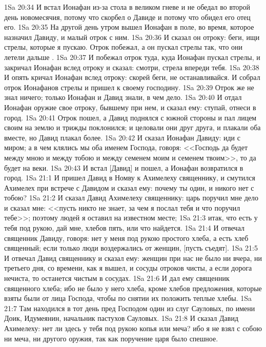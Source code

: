 \vs 1Sa 20:34 И встал Ионафан из-за стола в великом гневе и не обедал во второй день новомесячия, потому что скорбел о Давиде и потому что обидел его отец его.
\vs 1Sa 20:35 На другой день утром вышел Ионафан в поле, во время, которое назначил Давиду, и малый отрок с ним.
\vs 1Sa 20:36 И сказал он отроку: беги, ищи стрелы, которые я пускаю. Отрок побежал, а он пускал стрелы так, что они летели дальше .
\vs 1Sa 20:37 И побежал отрок туда, куда Ионафан пускал стрелы, и закричал Ионафан вслед отроку и сказал: смотри, стрела впереди тебя.
\vs 1Sa 20:38 И опять кричал Ионафан вслед отроку: скорей беги, не останавливайся. И собрал отрок Ионафанов стрелы и пришел к своему господину.
\vs 1Sa 20:39 Отрок же не знал ничего; только Ионафан и Давид знали, в чем дело.
\vs 1Sa 20:40 И отдал Ионафан оружие свое отроку, бывшему при нем, и сказал ему: ступай, отнеси в город.
\vs 1Sa 20:41 Отрок пошел, а Давид поднялся с южной стороны и пал лицем своим на землю и трижды поклонился; и целовали они друг друга, и плакали оба вместе, но Давид плакал более.
\vs 1Sa 20:42 И сказал Ионафан Давиду: иди с миром; а в чем клялись мы оба именем Господа, говоря: <<Господь да будет между мною и между тобою и между семенем моим и семенем твоим>>, то да будет на веки.
\vs 1Sa 20:43 И встал [Давид] и пошел, а Ионафан возвратился в город.
\vs 1Sa 21:1 И пришел Давид в Номву к Ахимелеху священнику, и смутился Ахимелех при встрече с Давидом и сказал ему: почему ты один, и никого нет с тобою?
\vs 1Sa 21:2 И сказал Давид Ахимелеху священнику: царь поручил мне дело и сказал мне: <<пусть никто не знает, за чем я послал тебя и что поручил тебе>>; поэтому людей я оставил на известном месте;
\vs 1Sa 21:3 итак, что есть у тебя под рукою, дай мне, хлебов пять, или что найдется.
\vs 1Sa 21:4 И отвечал священник Давиду, говоря: нет у меня под рукою простого хлеба, а есть хлеб священный; если только люди  воздержались от женщин, [пусть съедят].
\vs 1Sa 21:5 И отвечал Давид священнику и сказал ему: женщин при нас не было ни вчера, ни третьего дня, со времени, как я вышел, и сосуды отроков чисты, а если дорога нечиста, то  останется чистым в сосудах.
\vs 1Sa 21:6 И дал ему священник священного хлеба; ибо не было у него хлеба, кроме хлебов предложения, которые взяты были от лица Господа, чтобы по снятии их положить теплые хлебы.
\vs 1Sa 21:7 Там находился в тот день пред Господом один из слуг Сауловых, по имени Доик, Идумеянин, начальник пастухов Сауловых.
\vs 1Sa 21:8 И сказал Давид Ахимелеху: нет ли здесь у тебя под рукою копья или меча? ибо я не взял с собою ни меча, ни другого оружия, так как поручение царя было спешное.
